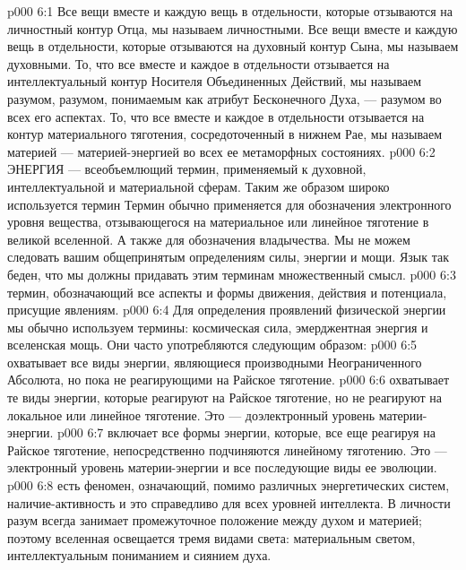 \vs p000 6:1 Все вещи вместе и каждую вещь в отдельности, которые отзываются на личностный контур Отца, мы называем личностными. Все вещи вместе и каждую вещь в отдельности, которые отзываются на духовный контур Сына, мы называем духовными. То, что все вместе и каждое в отдельности отзывается на интеллектуальный контур Носителя Объединенных Действий, мы называем разумом, разумом, понимаемым как атрибут Бесконечного Духа, --- разумом во всех его аспектах. То, что все вместе и каждое в отдельности отзывается на контур материального тяготения, сосредоточенный в нижнем Рае, мы называем материей --- материей\hyp{}энергией во всех ее метаморфных состояниях.
\vs p000 6:2 \pc ЭНЕРГИЯ --- всеобъемлющий термин, применяемый к духовной, интеллектуальной и материальной сферам. Таким же образом широко используется термин  Термин  обычно применяется для обозначения электронного уровня вещества, отзывающегося на материальное или линейное тяготение в великой вселенной. А также для обозначения владычества. Мы не можем следовать вашим общепринятым определениям силы, энергии и мощи. Язык так беден, что мы должны придавать этим терминам множественный смысл.
\vs p000 6:3 \pc {} термин, обозначающий все аспекты и формы движения, действия и потенциала, присущие явлениям.
\vs p000 6:4 Для определения проявлений физической энергии мы обычно используем термины: космическая сила, эмерджентная энергия и вселенская мощь. Они часто употребляются следующим образом:
\vs p000 6:5 \bibnobreakspace {} охватывает все виды энергии, являющиеся производными Неограниченного Абсолюта, но пока не реагирующими на Райское тяготение.
\vs p000 6:6 \bibnobreakspace {} охватывает те виды энергии, которые реагируют на Райское тяготение, но не реагируют на локальное или линейное тяготение. Это --- доэлектронный уровень материи\hyp{}энергии.
\vs p000 6:7 \bibnobreakspace {} включает все формы энергии, которые, все еще реагируя на Райское тяготение, непосредственно подчиняются линейному тяготению. Это --- электронный уровень материи\hyp{}энергии и все последующие виды ее эволюции.
\vs p000 6:8 \pc {} есть феномен, означающий, помимо различных энергетических систем, наличие\hyp{}активность  и это справедливо для всех уровней интеллекта. В личности разум всегда занимает промежуточное положение между духом и материей; поэтому вселенная освещается тремя видами света: материальным светом, интеллектуальным пониманием и сиянием духа.
